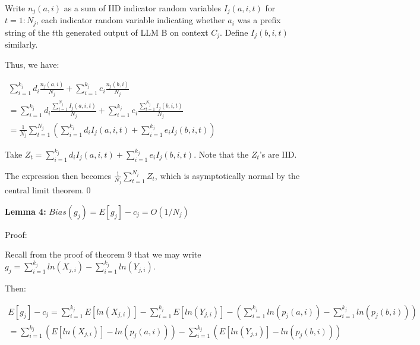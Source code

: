 \documentclass{article}
\begin{document}
Write $\displaystyle n_{j}\left( a,i\right)$ as a sum of IID indicator random variables $\displaystyle I_{j}\left( a,i,t\right)$ for $\displaystyle t=1:N_{j}$, each indicator random variable indicating whether $\displaystyle a_{i}$ was a prefix string of the $\displaystyle t$th generated output of LLM B on context $\displaystyle C_{j}$. Define $\displaystyle I_{j}\left( b,i,t\right)$ similarly.

Thus, we have:

$\displaystyle \begin{array}{l}
\sum _{i=1}^{k_{j}} d_{i}\frac{n_{j}\left( a,i\right)}{N_{j}} +\sum _{i=1}^{k_{j}} e_{i}\frac{n_{j}\left( b,i\right)}{N_{j}}\\
=\sum _{i=1}^{k_{j}} d_{i}\frac{\sum _{t=1}^{N_{j}} I_{j}\left( a,i,t\right)}{N_{j}} +\sum _{i=1}^{k_{j}} e_{i}\frac{\sum _{t=1}^{N_{j}} I_{j}\left( b,i,t\right)}{N_{j}}\\
=\frac{1}{N_{j}}\sum _{t=1}^{N_{j}}\left(\sum _{i=1}^{k_{j}} d_{i} I_{j}\left( a,i,t\right) +\sum _{i=1}^{k_{j}} e_{i} I_{j}\left( b,i,t\right)\right)
\end{array}$

Take $\displaystyle Z_{t} =\sum _{i=1}^{k_{j}} d_{i} I_{j}\left( a,i,t\right) +\sum _{i=1}^{k_{j}} e_{i} I_{j}\left( b,i,t\right)$. Note that the $\displaystyle Z_{t}$'s are IID.

The expression then becomes $\displaystyle \frac{1}{N_{j}}\sum _{t=1}^{N_{j}} Z_{t}$, which is asymptotically normal by the central limit theorem.\qed 



\textbf{Lemma 4: }$\displaystyle Bias\left( g_{j}\right) =E\left[ g_{j}\right] -c_{j} =O\left( 1/N_{j}\right)$

Proof:

Recall from the proof of theorem 9 that we may write $\displaystyle g_{j} =\sum _{i=1}^{k_{j}} ln\left( X_{j,i}\right) -\sum _{i=1}^{k_{j}} ln\left( Y_{j,i}\right)$.

Then:

$\displaystyle  \begin{array}{l}
E\left[ g_{j}\right] -c_{j} =\sum _{i=1}^{k_{j}} E\left[ ln\left( X_{j,i}\right)\right] -\sum _{i=1}^{k_{j}} E\left[ ln\left( Y_{j,i}\right)\right] -\left(\sum _{i=1}^{k_{j}} ln\left( p_{j}\left( a,i\right)\right) -\sum _{i=1}^{k_{j}} ln\left( p_{j}\left( b,i\right)\right)\right)\\
=\sum _{i=1}^{k_{j}}\left( E\left[ ln\left( X_{j,i}\right)\right] -ln\left( p_{j}\left( a,i\right)\right)\right) -\sum _{i=1}^{k_{j}}\left( E\left[ ln\left( Y_{j,i}\right)\right] -ln\left( p_{j}\left( b,i\right)\right)\right)
\end{array}$
\end{document}
